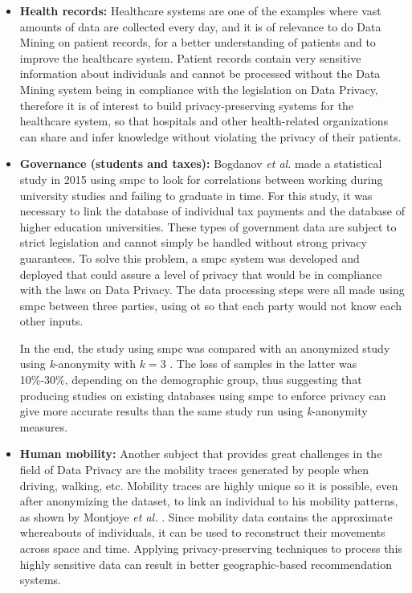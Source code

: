 \begin{itemize}
	\setlength\itemsep{1em}
	\item \textbf{Health records:} Healthcare systems are one of the examples where vast amounts of data are collected every day, and it is of relevance to do Data Mining on patient records, for a better understanding of patients and to improve the healthcare system. Patient records contain very sensitive information about individuals and cannot be processed without the Data Mining system being in compliance with the legislation on Data Privacy, therefore it is of interest to build privacy-preserving systems for the healthcare system, so that hospitals and other health-related organizations can share and infer knowledge without violating the privacy of their patients.

	\item \textbf{Governance (students and taxes):} Bogdanov \textit{et al.} \cite{Bogdanov2015} made a statistical study in 2015 using \ac{smpc} to look for correlations between working during university studies and failing to graduate in time. For this study, it was necessary to link the database of individual tax payments and the database of higher education universities. These types of government data are subject to strict legislation and cannot simply be handled without strong privacy guarantees.
    To solve this problem, a \ac{smpc} system was developed and deployed that could assure a level of privacy that would be in compliance with the laws on Data Privacy. The data processing steps were all made using \ac{smpc} between three parties, using \ac{ot} so that each party would not know each other inputs.
    
    In the end, the study using \ac{smpc} was compared with an anonymized study using \textit{k}-anonymity with $\textit{k}=3$ . The loss of samples in the latter was 10\%-30\%, depending on the demographic group, thus suggesting that producing studies on existing databases using \ac{smpc} to enforce privacy can give more accurate results than the same study run using \textit{k}-anonymity measures.

	\item \textbf{Human mobility:} Another subject that provides great challenges in the field of Data Privacy are the mobility traces generated by people when driving, walking, etc. Mobility traces are highly unique so it is possible, even after anonymizing the dataset, to link an individual to his mobility patterns, as shown by Montjoye \textit{et al.} \cite{de2013unique}. Since mobility data contains the approximate whereabouts of individuals, it can be used to reconstruct their movements across space and time. Applying privacy-preserving techniques to process this highly sensitive data can result in better geographic-based recommendation systems.
\end{itemize}


